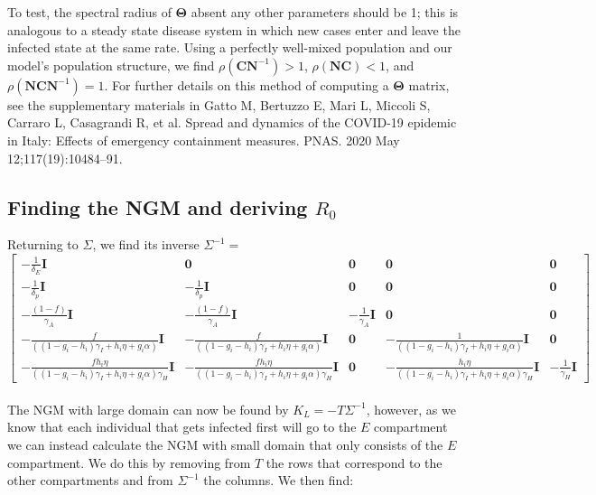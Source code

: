\documentclass{article}
\begin{document}
To test, the spectral radius of $\boldsymbol{\Theta}$ absent any other parameters should be 1; this is analogous to a steady state disease system in which new cases enter and leave the infected state at the same rate. Using a perfectly well-mixed population and our model's population structure, we find $\rho(\boldsymbol{C} \boldsymbol{N}^{-1}) > 1$, $\rho(\boldsymbol{N} \boldsymbol{C}) < 1$, and $\rho(\boldsymbol{N} \boldsymbol{C} \boldsymbol{N}^{-1}) = 1$. For further details on this method of computing a $\boldsymbol{\Theta}$ matrix, see the supplementary materials in Gatto M, Bertuzzo E, Mari L, Miccoli S, Carraro L, Casagrandi R, et al. Spread and dynamics of the COVID-19 epidemic in Italy: Effects of emergency containment measures. PNAS. 2020 May 12;117(19):10484–91.\\  

\subsection*{Finding the NGM and deriving $R_0$}

Returning to $\Sigma$, we find its inverse $\Sigma^{-1} = $
\\
\noindent
\[
  \begin{bmatrix}  
   - \frac{1}{\delta_E} \boldsymbol{I} & \boldsymbol{0} & \boldsymbol{0} & \boldsymbol{0} & \boldsymbol{0} \\
   -\frac{1}{\delta_p} \boldsymbol{I} & -\frac{1}{\delta_p} \boldsymbol{I} & \boldsymbol{0} & \boldsymbol{0} & \boldsymbol{0} \\
   -\frac{(1-f)}{\gamma_A} \boldsymbol{I} & -\frac{(1-f)}{\gamma_A} \boldsymbol{I} & -\frac{1}{\gamma_A} \boldsymbol{I} & \boldsymbol{0} & \boldsymbol{0} \\
   -\frac{f}{((1-g_i-h_i) \gamma_{I} + h_i \eta + g_i \alpha)} \boldsymbol{I} & -\frac{f}{((1-g_i-h_i) \gamma_{I} + h_i \eta + g_i \alpha)} \boldsymbol{I} & \boldsymbol{0} & -\frac{1}{((1-g_i-h_i) \gamma_{I} + h_i \eta + g_i \alpha)} \boldsymbol{I} & \boldsymbol{0} \\
   -\frac{fh_i \eta}{((1-g_i-h_i) \gamma_{I} + h_i \eta + g_i \alpha)\gamma_H} \boldsymbol{I} & -\frac{fh_i \eta}{((1-g_i-h_i) \gamma_{I} + h_i \eta + g_i \alpha)\gamma_H} \boldsymbol{I} & \boldsymbol{0} & -\frac{h_i \eta}{((1-g_i-h_i) \gamma_{I} + h_i \eta + g_i \alpha)\gamma_H} \boldsymbol{I} & -\frac{1}{\gamma_H} \boldsymbol{I} 
   \end{bmatrix}
\]
\\
The NGM with large domain can now be found by $K_L = - T \Sigma^{-1}$, however, as we know that each individual that gets infected first will go to the $E$ compartment we can instead calculate the NGM with small domain that only consists of the $E$ compartment.
We do this by removing from $T$ the rows that correspond to the other compartments and from $\Sigma^{-1}$ the columns. 
We then find: 
\end{document}
